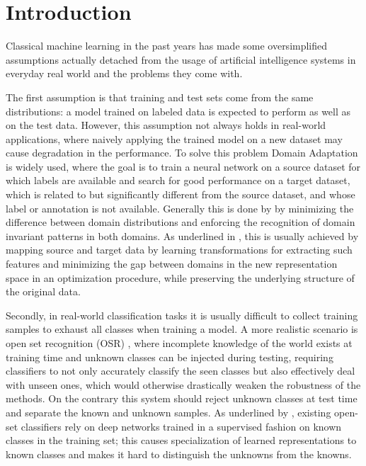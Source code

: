 \documentclass[10pt,twocolumn,letterpaper]{article}
\begin{document}
\section{Introduction}
\label{sec:intro}



Classical machine learning in the past years has made some oversimplified assumptions actually detached %
from the usage of artificial intelligence systems in everyday real world and the problems they come with.

The first assumption is that training and test sets come from the same distributions:
a model trained on labeled data is expected to perform as well as on the test data.
However, this assumption not always holds in real-world applications, 
where naively applying the trained model on a new dataset may cause degradation in the performance.
To solve this problem Domain Adaptation is widely used, 
where the goal is to train a neural network on a source dataset for which labels are available and search for good performance on a target dataset, 
which is related to but significantly different from the source dataset, 
and whose label or annotation is not available. 
Generally this is done by by minimizing the difference between domain distributions and enforcing the recognition of domain invariant patterns in both domains. 
As underlined in \cite{domainAdaptFarahani}, 
this is usually achieved by mapping source and target data by learning transformations for extracting such features and minimizing the gap between domains in the new representation space in an optimization procedure,
while preserving the underlying structure of the original data. 

Secondly, 
in real-world classification tasks it is usually difficult to collect training samples to exhaust all classes when training a model.
A more realistic scenario is open set recognition (OSR) \cite{OSRsurvey},
where incomplete knowledge of the world exists at training time and unknown classes can be injected during testing, 
requiring classifiers to not only accurately classify the seen classes but also effectively deal with unseen ones,
which would otherwise drastically weaken the robustness of the methods.
On the contrary this system should reject unknown classes at test time and separate the known and unknown samples.
As underlined by \cite{OSRclassRec}, 
existing open-set classifiers rely on deep networks trained in a supervised fashion on known classes in the training set;
this causes specialization of learned representations to known classes and makes it hard to distinguish the unknowns from the knowns.
\end{document}
